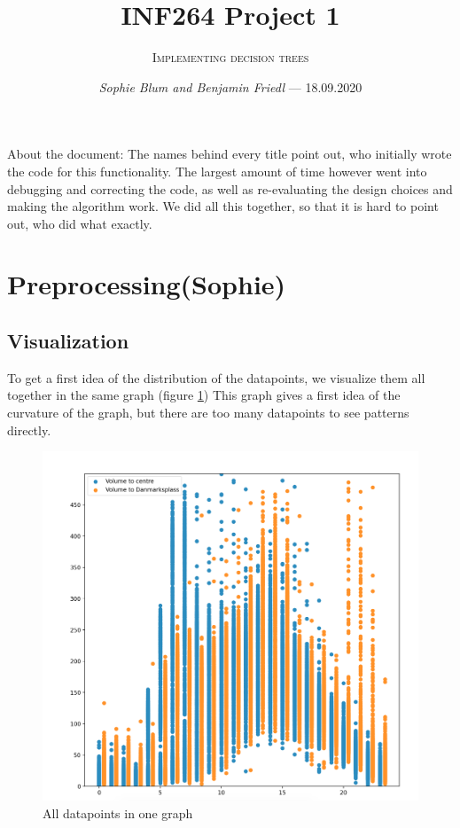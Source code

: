 \documentclass[12pt,a4paper]{scrartcl}		%
\newcommand\svthema{INF264 Project 1}
\newcommand\svperson{Sophie Blum and Benjamin Friedl}
\newcommand\svdatum{18.09.2020}
\newcommand\lvname{Implementing decision trees}
\begin{document}
\title{ \svthema}
\author{\textsc{\lvname}}
\date{ \small \textsl{\svperson} --- \svdatum }
\maketitle

\abstract
About the document:
The names behind every title point out, who initially wrote the code for this functionality. 
The largest amount of time however went into debugging and correcting the code, as well as re-evaluating the 
design choices and making the algorithm work. We did all this together, so that it is hard to point out, who 
did what exactly.

\section{Preprocessing(Sophie)}
\subsection{Visualization}
To get a first idea of the distribution of the datapoints, we visualize them all together in the same graph (figure \ref{fig::all})
This graph gives a first idea of the curvature of the graph, but there are too many datapoints to see patterns directly.
\begin{figure}[h]
    \centering
    \includegraphics[scale = 0.45]{vis_all.png}
    \caption{All datapoints in one graph}
    \label{fig::all}
\end{figure}
\end{document}
